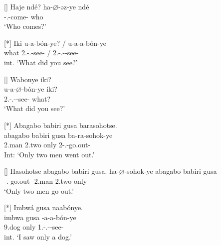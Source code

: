 \documentclass[output=paper]{langscibook}
\begin{document}
\ex
[]{
\label{bkm:Ref72332402:c}
Haje ndé?    
\gll
ha-$\varnothing$-əz-ye  ndé\\
\EXP{}-\PRS.\CJ{}-come-\PFV{}  who\\
\glt
‘Who comes?’\\
}

\z
\z

\ea\label{bkm:Ref105321835}
\ea
[*]{
\label{bkm:Ref105321835:a}
\gll 
Iki  u-a-bón-ye? / u-a-a-bón-ye\\
what  2\SG.\SM-\N.\PST-{}see-\PFV{} / 2\SG.\SM-\N.\PST-\DJ-{}see-\PFV{}\\
\glt
int. ‘What did you see?’\\
}


\ex
[]{
\label{bkm:Ref105321835:b}
Wabonye iki?\\
\gll
u-a-$\varnothing$-bón-ye  iki?\\
2\SG.\SM-\N.\PST-\CJ{}-{}see-\PFV{}  what?\\
\glt
‘What did you see?’\\
}

\z
\z

\ea
\label{bkm:Ref105321684}
\ea
[*]{
\label{bkm:Ref105321684:a}
Abagabo babiri gusa barasohotse.\\
\gll
abagabo  babiri  gusa  ba-ra-sohok-ye\\
2.man  2.two  only  2\SM-\PRS.\DJ{}-go.out-\PFV{}\\
\glt
Int: ‘Only two men went out.’\\
}

\ex
[]{
\label{bkm:Ref105321684:b}
Hasohotse abagabo babiri gusa.      
\gll
ha-$\varnothing$-sohok-ye  abagabo  babiri  gusa\\
\EXP-\PRS.\CJ{}-go.out-\PFV{}  2.man  2.two  only\\
\glt
‘Only two men go out.’\\
}

\z\z

\ea
\label{bkm:Ref142557423}
\ea
[*]{
\label{bkm:Ref142557423:a}
Imbwá gusa naabónye.\\
\gll
imbwa  gusa  \N{}-a-a-bón-ye\\
9.dog  only  1\SG.\SM-\N.\PST-\DJ{}-see-\PFV{}\\
\glt
int. ‘I saw only a dog.’\\
}
\end{document}
